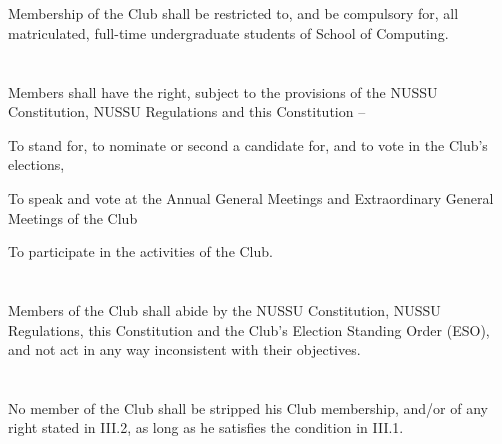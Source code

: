 
\section{}
Membership of the Club shall be restricted to, and be compulsory for, all matriculated, full-time undergraduate students of School of Computing.

\section{}
Members shall have the right, subject to the provisions of the NUSSU Constitution, NUSSU Regulations and this Constitution –
	\begin{legal}
		\item To stand for, to nominate or second a candidate for, and to vote in the Club's elections,
		\item To speak and vote at the Annual General Meetings and Extraordinary General Meetings of the Club
		\item To participate in the activities of the Club.
	\end{legal}

\section{}
Members of the Club shall abide by the NUSSU Constitution, NUSSU Regulations, this Constitution and the Club's Election Standing Order (ESO), and not act in any way inconsistent with their objectives.

\section{}
No member of the Club shall be stripped his Club membership, and/or of any right stated in III.2, as long as he satisfies the condition in III.1.